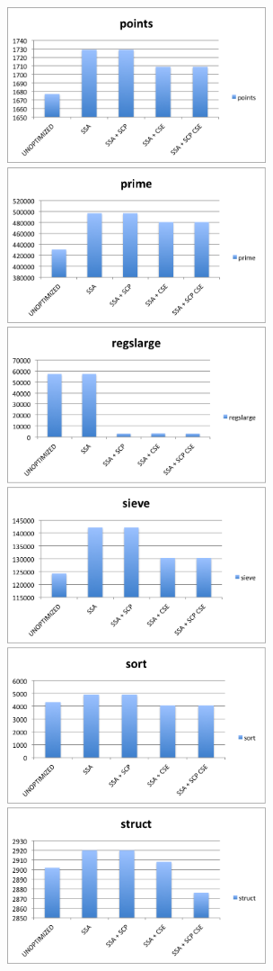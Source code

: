 \documentclass[12pt,letterpaper]{article}
\begin{document}
\begin{center}
\includegraphics[width=3in]{points.png}
\includegraphics[width=3in]{prime.png}
\includegraphics[width=3in]{regslarge.png}
\includegraphics[width=3in]{sieve.png}
\includegraphics[width=3in]{sort.png}
\includegraphics[width=3in]{struct.png}
\end{center}
\end{document}
